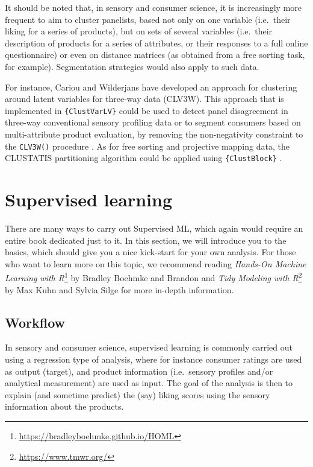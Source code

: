 \documentclass[
]{krantz}
\renewcommand{\href}[2]{#2\footnote{\url{#1}}}
\begin{document}
It should be noted that, in sensory and consumer science, it is increasingly more frequent to aim to cluster panelists, based not only on one variable (i.e.~their liking for a series of products), but on sets of several variables (i.e.~their description of products for a series of attributes, or their responses to a full online questionnaire) or even on distance matrices (as obtained from a free sorting task, for example). Segmentation strategies would also apply to such data.

For instance, Cariou and Wilderjans have developed an approach for clustering around latent variables for three-way data (CLV3W). This approach that is implemented in \texttt{\{ClustVarLV\}} could be used to detect panel disagreement in three-way conventional sensory profiling data \citep{wilderjans2016} or to segment consumers based on multi-attribute product evaluation, by removing the non-negativity constraint to the \texttt{CLV3W()} procedure \citep{cariou2018}. As for free sorting and projective mapping data, the CLUSTATIS partitioning algorithm could be applied using \texttt{\{ClustBlock\}} \citep[\citet{llobell2020}]{llobell2019}.

\hypertarget{superv_learning}{%
\section{Supervised learning}\label{superv_learning}}

There are many ways to carry out Supervised ML, which again would require an entire book dedicated just to it. In this section, we will introduce you to the basics, which should give you a nice kick-start for your own analysis. For those who want to learn more on this topic, we recommend reading \href{https://bradleyboehmke.github.io/HOML}{\emph{Hands-On Machine Learning with R}} by Bradley Boehmke and Brandon and \href{https://www.tmwr.org/}{\emph{Tidy Modeling with R}} by Max Kuhn and Sylvia Silge for more in-depth information.

\hypertarget{workflow}{%
\subsection{Workflow}\label{workflow}}

In sensory and consumer science, supervised learning is commonly carried out using a regression type of analysis, where for instance consumer ratings are used as output (target), and product information (i.e.~sensory profiles and/or analytical measurement) are used as input. The goal of the analysis is then to explain (and sometime predict) the (say) liking scores using the sensory information about the products.
\end{document}
